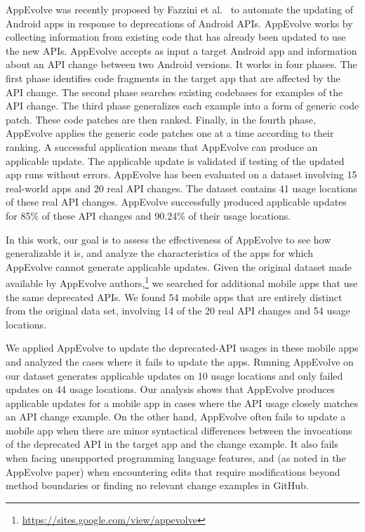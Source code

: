 AppEvolve was recently proposed by Fazzini et
al.~\cite{fazzini2019automated} to automate the updating of Android apps in
response to deprecations of Android APIs.  AppEvolve works by collecting
information from existing code that has already been updated to use the new
APIs.  AppEvolve accepts as input a target Android app and information
about an API change between two Android versions. It works in four
phases. The first phase identifies code fragments in the target app that
are affected by the API change. The second phase searches existing
codebases for examples of the API change. The third phase generalizes each
example into a form of generic code patch. These code patches are then
ranked. Finally, in the fourth phase, AppEvolve applies the generic code
patches one at a time according to their ranking. A successful application
means that AppEvolve can produce an applicable update. The applicable
update is validated if testing of the updated app runs without
errors. AppEvolve has been evaluated on a dataset involving 15 real-world
apps and 20 real API changes. The dataset contains 41 usage locations of
these real API changes. AppEvolve successfully produced applicable updates
for 85\% of these API changes and 90.24\% of their usage locations.

In this work, our goal is to assess the effectiveness of AppEvolve to see
how generalizable it is, and analyze the characteristics of the apps for
which AppEvolve cannot generate applicable updates.  Given the original
dataset made available by AppEvolve
authors,\footnote{\url{https://sites.google.com/view/appevolve}} we
searched for additional mobile apps that use the same deprecated APIs. We
found 54 mobile apps that are entirely distinct from the original data set,
involving 14 of the 20 real API changes and 54 usage locations.

We applied AppEvolve to update the deprecated-API usages in these mobile
apps and analyzed the cases where it fails to update the apps. Running
AppEvolve on our dataset generates applicable updates on 10 usage locations
and only failed updates on 44 usage locations. Our analysis shows that
AppEvolve produces applicable updates for a mobile app in cases where the
API usage closely matches an API change example.  On the other hand,
AppEvolve often fails to update a mobile app when there are minor
syntactical differences between the invocations of the deprecated API in
the target app and the change example.  It also fails when facing
unsupported programming language features, and (as noted in the AppEvolve
paper) when encountering edits that require modifications beyond method
boundaries or finding no relevant change examples in GitHub.


